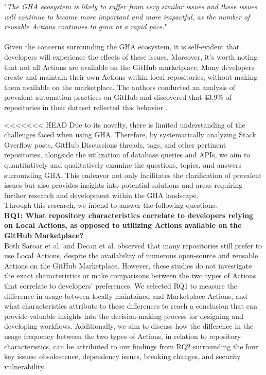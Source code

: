 \documentclass[conference]{IEEEtran}
\begin{document}
"\textit{The GHA ecosystem is likely to suffer from very similar issues and these issues will continue to become more important and more impactful, as the number of reusable Actions continues to grow at a rapid pace.}"\\\\
Given the concerns surrounding the GHA ecosystem, it is self-evident that developers will experience the effects of these issues.  Moreover, it's worth noting that not all Actions are available on the GitHub marketplace. Many developers create and maintain their own Actions within local repositories, without making them available on the marketplace. The authors  conducted an analysis of prevalent automation practices on GitHub and discovered that 43.9\% of repositories in their dataset reflected this behavior \cite{decan2022use}.

<<<<<<< HEAD
    Due to its novelty, there is limited understanding of the challenges faced when using GHA. Therefore,  by systematically analyzing Stack Overflow posts, GitHub Discussions threads, tags, and other pertinent repositories, alongside the utilization of database queries and APIs, we aim to quantitatively and qualitatively examine the questions, topics, and answers surrounding GHA. This endeavor not only facilitates the clarification of prevalent issues but also provides insights into potential solutions and areas requiring further research and development within the GHA landscape.\\

    Through this research, we intend to answer the following questions:\\

    \textbf{RQ1: What repository characteristics correlate to developers relying on Local Actions, as opposed to utilizing Actions available on the GitHub Marketplace?}\\


    Both Saroar et al. \cite{saroar2023developers} and Decan et al. \cite{decan2022use} observed that many repositories still prefer to use Local Actions, despite the availability of numerous open-source and reusable Actions on the GitHub Marketplace. However, these studies do not investigate the exact characteristics or make comparisons between the two types of Actions that correlate to developers' preferences. We selected RQ1 to measure the difference in usage between locally maintained and Marketplace Actions, and what characteristics attribute to these differences to reach a conclusion that can provide valuable insights into the decision-making process for designing and developing workflows. Additionally, we aim to discuss how the difference in the usage frequency between the two types of Actions, in relation to repository characteristics, can be attributed to our findings from RQ2 surrounding the four key issues: obsolescence, dependency issues, breaking changes, and security vulnerability.
\end{document}
